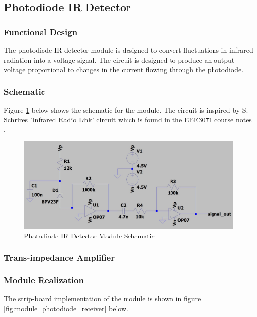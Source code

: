 



\subsection{Photodiode IR Detector}

\subsubsection{Functional Design}
The photodiode IR detector module is designed to convert fluctuations in infrared radiation into a voltage signal. The circuit is designed to produce an output voltage proportional to changes in the current flowing through the photodiode.


\subsubsection{Schematic}
Figure \ref{fig:schematic_photodiode_transimpedance} below shows the schematic for the module. The circuit is inspired by S. Schrires 'Infrared Radio Link' circuit which is found in the EEE3071 course notes \cite{Schrire2007}.


\begin{figure}[H]
	\centering
	\includegraphics[width=.8\textwidth]{figures/design/photodiode_transimpedance.JPG}
	\caption{Photodiode IR Detector Module Schematic}
	\label{fig:schematic_photodiode_transimpedance}
\end{figure}

\subsubsection{Trans-impedance Amplifier}


\subsubsection{Module Realization}
The strip-board implementation of the module is shown in figure \ref{fig:module_photodiode_receiver} below.

